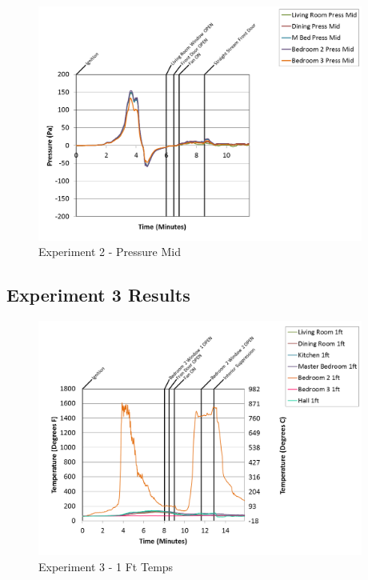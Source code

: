 \documentclass{article}
\begin{document}
\begin{appendices}
\clearpage

\begin{figure}[h!]
	\centering
	\includegraphics[height=3.05in]{0_Images/Results_Charts/Exp_2_Charts/PressureMid.png}
	\caption{Experiment 2 - Pressure Mid}
\end{figure}


\clearpage
\clearpage		\large
\subsection{Experiment 3 Results} \label{App:Exp3Results} 

\begin{figure}[h!]
	\centering
	\includegraphics[height=3.05in]{0_Images/Results_Charts/Exp_3_Charts/1FtTemps.png}
	\caption{Experiment 3 - 1 Ft Temps}
\end{figure}



\end{appendices}
\end{document}
